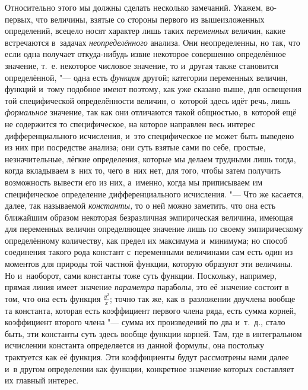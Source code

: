 Относительно этого мы должны сделать несколько замечаний. Укажем, во-первых,
что величины, взятые со стороны первого из вышеизложенных определений, всецело
носят характер лишь таких {\em переменных} величин, какие встречаются в~задачах
{\em неопределённого} анализа. Они неопределенны, но так, что если одна
получает откуда-нибудь извне некоторое совершенно определённое значение, т.~е.
некоторое числовое значение, то и~другая также становится определённой, "---
одна есть {\em функция} другой; категории переменных величин, функций и~тому
подобное имеют поэтому, как уже сказано выше, для освещения той специфической
определённости величин, о~которой здесь идёт речь, лишь {\em формальное}
значение, так как они отличаются такой общностью, в~которой ещё не содержится
то специфическое, на которое направлен весь интерес дифференциального
исчисления, и~это специфическое не может быть выведено из них при посредстве
анализа; они суть взятые сами по себе, простые, незначительные, лёгкие
определения, которые мы делаем трудными лишь тогда, когда вкладываем в~них то,
чего в~них нет, для того, чтобы затем получить возможность вывести его из них,
а~именно, когда мы приписываем им специфическое определение дифференциального
исчисления. "--- Что же касается, далее, так называемой {\em константы,} то о
ней можно заметить, что она есть ближайшим образом некоторая безразличная
эмпирическая величина, имеющая для переменных величин определяющее значение
лишь по своему эмпирическому определённому количеству, как предел их максимума
и~минимума; но способ соединения такого рода констант с~переменными величинами
сам есть один из моментов для природы той частной функции, которую образуют эти
величины. Но и~наоборот, сами константы тоже суть функции. Поскольку, например,
прямая линия имеет значение {\em параметра} параболы, это её значение состоит в
том, что она есть функция $\frac{y^2}x$; точно так же, как в~разложении
двучлена вообще та константа, которая есть коэффициент первого члена ряда, есть
сумма корней, коэффициент второго члена "--- сумма их произведений по два
и~т.~д., стало быть, эти константы суть здесь вообще функции корней. Там, где в
интегральном исчислении константа определяется из данной формулы, она постольку
трактуется как её функция. Эти коэффициенты будут рассмотрены нами далее и~в
другом определении как функции, конкретное значение которых составляет их
главный интерес.

